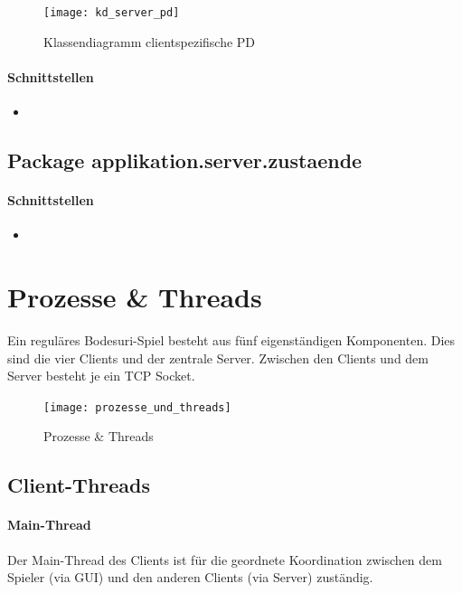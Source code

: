 \documentclass[12pt,halfparskip]{scrartcl}
\begin{document}
		\begin{figure}[H]
			\centering
			\texttt{[image: kd\_server\_pd]}
			\caption{Klassendiagramm clientspezifische PD}
			\label{fig:kd_server_pd}
		\end{figure}


		\paragraph{Schnittstellen}
		\begin{itemize}
			\item 
		\end{itemize}
	
	\subsection{Package applikation.server.zustaende}

		\paragraph{Schnittstellen}
		\begin{itemize}
			\item 
		\end{itemize}	


\clearpage
\section{Prozesse \& Threads}
Ein reguläres Bodesuri-Spiel besteht aus fünf eigenständigen Komponenten. Dies sind die vier Clients und der zentrale Server. Zwischen den Clients und dem Server besteht je ein TCP Socket. 

\begin{figure}[h]
	\centering
	\texttt{[image: prozesse\_und\_threads]}
	\caption{Prozesse \& Threads}
	\label{fig:prozesse_und_threads}
\end{figure}

\clearpage
\subsection{Client-Threads}
\label{ssub:client_threads}

\paragraph{Main-Thread}
\label{ssub:main_thread}

Der Main-Thread des Clients ist für die geordnete Koordination zwischen dem Spieler (via GUI) und den anderen Clients (via Server) zuständig.
\end{document}
